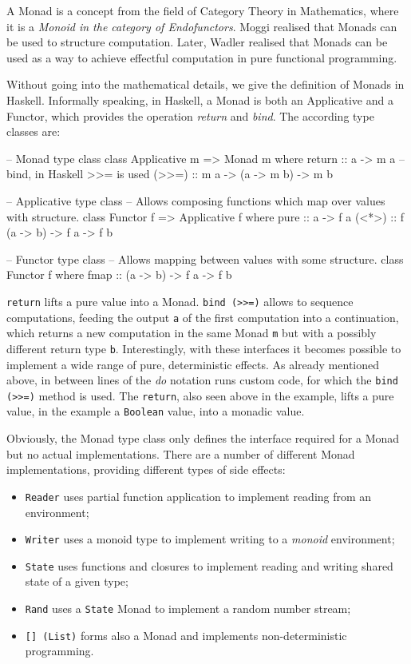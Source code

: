 A Monad is a concept from the field of Category Theory in Mathematics, where it is a \textit{Monoid in the category of Endofunctors}. Moggi \cite{moggi_computational_1989} realised that Monads can be used to structure computation. Later, Wadler \cite{wadler_monads_1995,wadler_how_1997} realised that Monads can be used as a way to achieve effectful computation in pure functional programming. 

Without going into the mathematical details, we give the definition of Monads in Haskell. Informally speaking, in Haskell, a Monad is both an Applicative and a Functor, which provides the operation \textit{return} and \textit{bind}. The according type classes are:

\begin{HaskellCode}
-- Monad type class
class Applicative m => Monad m where
  return :: a -> m a
  -- bind, in Haskell >>= is used
  (>>=) :: m a -> (a -> m b) -> m b 

-- Applicative type class
-- Allows composing functions which map over values with structure.
class Functor f => Applicative f where
  pure  :: a -> f a
  (<*>) :: f (a -> b) -> f a -> f b

-- Functor type class
-- Allows mapping between values with some structure.
class Functor f where
  fmap :: (a -> b) -> f a -> f b
\end{HaskellCode}

\texttt{return} lifts a pure value into a Monad. \texttt{bind (>>=)} allows to sequence computations, feeding the output \texttt{a} of the first computation into a continuation, which returns a new computation in the same Monad \texttt{m} but with a possibly different return type \texttt{b}. Interestingly, with these interfaces it becomes possible to implement a wide range of pure, deterministic effects. As already mentioned above, in between lines of the \textit{do} notation runs custom code, for which the \texttt{bind (>>=)} method is used. The \texttt{return}, also seen above in the example, lifts a pure value, in the example a \texttt{Boolean} value, into a monadic value.

Obviously, the Monad type class only defines the interface required for a Monad but no actual implementations. There are a number of different Monad implementations, providing different types of side effects:

\begin{itemize}
	\item \texttt{Reader} uses partial function application to implement reading from an environment;
	\item \texttt{Writer} uses a monoid type to implement writing to a \textit{monoid} environment;
	\item \texttt{State} uses functions and closures to implement reading and writing shared state of a given type;
	\item \texttt{Rand} uses a \texttt{State} Monad to implement a random number stream;
	\item \texttt{[] (List)} forms also a Monad and implements non-deterministic programming.
\end{itemize}

